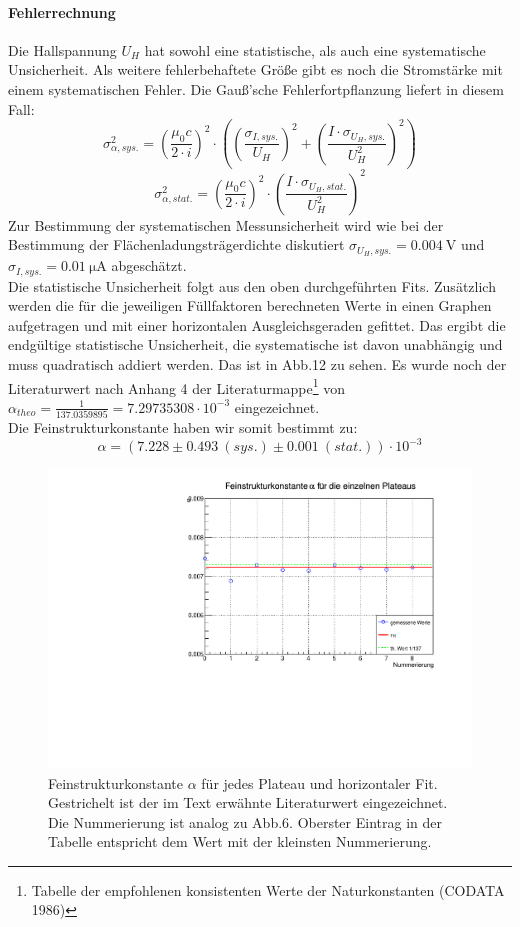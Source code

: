 \paragraph{Fehlerrechnung}
Die Hallspannung $U_H$ hat sowohl eine statistische, als auch eine systematische Unsicherheit. Als weitere fehlerbehaftete Größe gibt es noch die Stromstärke mit einem systematischen Fehler. Die Gauß'sche Fehlerfortpflanzung liefert in diesem Fall:
$$\sigma _{\alpha, sys.}^{2} = (\frac{\mu _0 c}{2 \cdot i})^{2} \cdot ((\frac{\sigma _{I, sys.}}{U_H})^{2} + (\frac{I \cdot \sigma _{U_H, sys.}}{U_H ^{2}})^{2}) $$
$$\sigma _{\alpha, stat.}^{2} = (\frac{\mu _0 c}{2 \cdot i})^{2} \cdot (\frac{I \cdot \sigma _{U_H, stat.}}{U_H ^{2}})^{2} $$
Zur Bestimmung der systematischen Messunsicherheit wird wie bei der Bestimmung der Flächenladungsträgerdichte diskutiert $\sigma _{U_H, sys.} = 0.004 \ \mathrm{V}$ und $\sigma _{I, sys.} = 0.01 \ \mathrm{\mu A}$ abgeschätzt. \\
Die statistische Unsicherheit folgt aus den oben durchgeführten Fits. Zusätzlich werden die für die jeweiligen Füllfaktoren berechneten Werte in einen Graphen aufgetragen und mit einer horizontalen Ausgleichsgeraden gefittet. Das ergibt die endgültige statistische Unsicherheit, die systematische ist davon unabhängig und muss quadratisch addiert werden. Das ist in Abb.12 zu sehen. Es wurde noch  der Literaturwert nach Anhang 4 der Literaturmappe\footnote{Tabelle der empfohlenen konsistenten Werte der Naturkonstanten (CODATA 1986)} von $\alpha _{theo} = \frac{1}{137.0359895} = 7.29735308 \cdot 10^{-3}$ eingezeichnet.\\
Die Feinstrukturkonstante haben wir somit bestimmt zu:
$$\alpha = (7.228 \pm 0.493 \ (sys.) \pm 0.001 \ (stat.)) \cdot 10^{-3}$$


\begin{figure}[h]
\centering
\includegraphics[scale=0.45]{../plots/alpha.pdf}
\caption{Feinstrukturkonstante $\alpha$ für jedes Plateau und horizontaler Fit. Gestrichelt ist der im Text erwähnte Literaturwert eingezeichnet. Die Nummerierung ist analog zu Abb.6. Oberster Eintrag in der Tabelle entspricht dem Wert mit der kleinsten Nummerierung.}
\end{figure}



